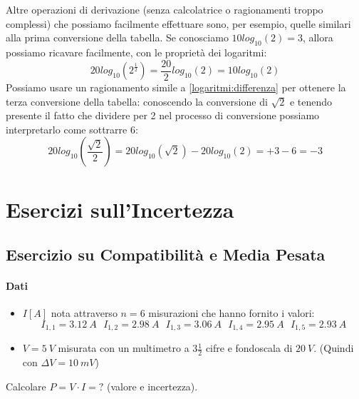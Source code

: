 \documentclass[a4paper,11pt]{report}
\begin{document}
Altre operazioni di derivazione (senza calcolatrice o ragionamenti troppo complessi) che possiamo facilmente effettuare sono, per esempio, quelle similari alla prima conversione della tabella. Se conosciamo $10log_{10}(2) = 3$, allora possiamo ricavare facilmente, con le proprietà dei logaritmi:
$$
  20log_{10}(2^{\frac{1}{2}}) = \frac{20}{2}log_{10}(2) = 10log_{10}(2)
$$
Possiamo usare un ragionamento simile a \ref{logaritmi:differenza} per ottenere la terza conversione della tabella: conoscendo la conversione di $\sqrt{2}$ e tenendo presente il fatto che dividere per 2 nel processo di conversione possiamo interpretarlo come sottrarre 6:
$$
  20log_{10}(\frac{\sqrt{2}}{2}) = 20log_{10}(\sqrt{2})-20log_{10}(2) = +3-6 = -3
$$ 
\chapter{Esercizi sull'Incertezza}
\section{Esercizio su Compatibilità e Media Pesata}
\subsubsection*{Dati}
\begin{itemize}
  \item $I[A]$ nota attraverso $n = 6$ misurazioni che hanno fornito i valori:
  $$
      I_{1,1} = 3.12~A~~~I_{1,2} = 2.98~A~~~I_{1,3} = 3.06~A~~~I_{1,4} = 2.95~A~~~I_{1,5} = 2.93~A
  $$
  \item $V = 5~V$ misurata con un multimetro a $3\frac{1}{2}$ cifre e fondoscala di $20~V$. (Quindi con $\Delta V = 10~mV$)
\end{itemize}
Calcolare $P=V\cdot I = ?$ (valore e incertezza).\\
\end{document}
